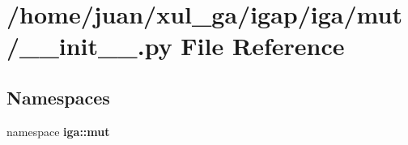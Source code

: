 \section{/home/juan/xul\_\-ga/igap/iga/mut/\_\-\_\-init\_\-\_\-.py File Reference}
\label{iga_2mut_2____init_____8py}
\subsection*{Namespaces}
\begin{CompactItemize}
\item 
namespace {\bf iga::mut}
\end{CompactItemize}
